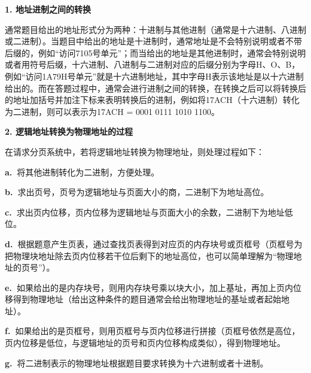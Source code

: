 \textbf{{1. 地址进制之间的转换}}

通常题目给出的地址形式分为两种：十进制与其他进制（通常是十六进制、八进制或二进制）。当题目中给出的地址是十进制时，通常地址是不会特别说明或者不带后缀的，例如``访问7105号单元''；而当给出的地址是其他进制时，通常会特别说明或者用符号后缀，十六进制、八进制与二进制对应的后缀分别为字母H、O、B，例如``访问1A79H号单元''就是十六进制地址，其中字母H表示该地址是以十六进制给出的。而在答题过程中，通常会进行进制之间的转换，在转换之后可以将转换后的地址加括号并加注下标来表明转换后的进制，例如将17ACH（十六进制）转化为二进制，则可以表示为17ACH
= 0001 0111 1010 1100。

{\textbf{2. 逻辑地址转换为物理地址的过程}}

在请求分页系统中，若将逻辑地址转换为物理地址，则处理过程如下：

\textbf{a.~}将其他进制转化为二进制，方便处理。

\textbf{b.~}求出页号，页号为逻辑地址与页面大小的商，二进制下为地址高位。

\textbf{c.~}求出页内位移，页内位移为逻辑地址与页面大小的余数，二进制下为地址低位。

\textbf{d.~}根据题意产生页表，通过查找页表得到对应页的内存块号或页框号（页框号为把物理块地址除去页内位移若干位后剩下的地址高位，也可以简单理解为``物理地址的页号''）。

\textbf{e.~}如果给出的是内存块号，则用内存块号乘以块大小，加上基址，再加上页内位移得到物理地址（给出这种条件的题目通常会给出物理地址的基址或者起始地址）。

\textbf{f.~}如果给出的是页框号，则用页框号与页内位移进行拼接（页框号依然是高位，页内位移是低位，与逻辑地址的页号和页内位移构成类似），得到物理地址。

\textbf{g.~}将二进制表示的物理地址根据题目要求转换为十六进制或者十进制。
